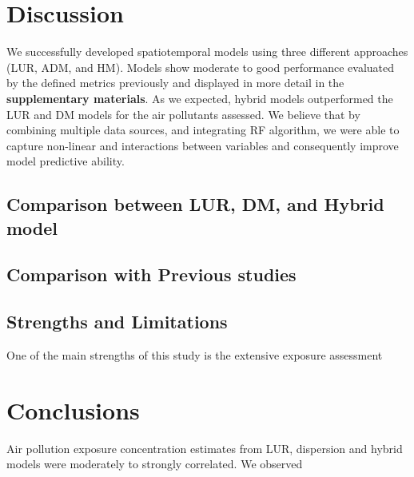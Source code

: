 \documentclass{article}
\begin{document}
\newpage

\section{Discussion}
We successfully developed spatiotemporal models using three different approaches (LUR, ADM, and HM). Models show moderate to good performance 
evaluated by the defined metrics previously and displayed in more detail in the \textbf{supplementary materials}. As we expected, hybrid models outperformed the LUR and DM models for the air pollutants assessed. We believe that by combining multiple data sources, and integrating RF algorithm, we were able to capture non-linear and interactions between variables and consequently improve model predictive ability. 

\subsection{Comparison between LUR, DM, and Hybrid model}






\subsection{Comparison with Previous studies}




\subsection{Strengths and Limitations}
One of the main strengths of this study is the extensive exposure assessment 

\section{Conclusions}

Air pollution exposure concentration estimates from LUR, dispersion and hybrid models were moderately to strongly correlated. We observed 



































\newpage


\end{document}
